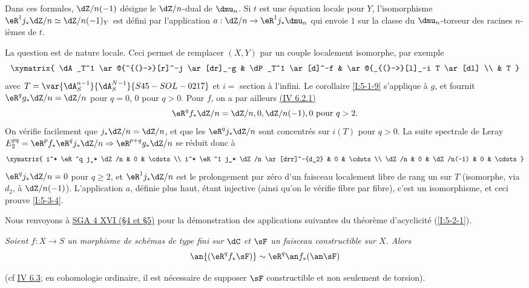 Dans ces formules, $\dZ/n(-1)$ désigne le $\dZ/n$-dual de $\dmu_n$. Si $t$ 
est une équation locale pour $Y$, l'isomorphisme 
$\eR^1j_*\dZ/n\simeq\dZ/n(-1)_Y$ est défini par l'application 
$a:\dZ/n\to \eR^1j_*\dmu_n$ qui envoie $1$ sur la classe du $\dmu_n$-torseur des 
racines $n$-ièmes de $t$. 

La question est de nature locale. Ceci permet de remplacer $(X,Y)$ par un 
couple localement isomorphe, par exemple 
\[\xymatrix{
  \dA_T^1 \ar@{^{(}->}[r]^-j \ar[dr]_-g 
    & \dP_T^1 \ar[d]^-f 
    & \ar@{_{(}->}[l]_-i T \ar[dl] \\
  & T
}\]
avec $T=\var{\dA_S^{n-1}}{\dA_S^{N-1}}{S45-SOL-0217}$ et $i=$ section à l'infini. Le corollaire \ref{I:5-1-9} 
s'applique à $g$, et fournit $\eR^q g_* \dZ/n=\dZ/n$ pour $q=0$, $0$ pour $q>0$. 
Pour $f$, on a par ailleurs \hyperref[I:eq:4-6-2-1]{(IV 6.2.1)}
\[
  \eR^q f_* \dZ/n = \dZ/n,0,\dZ/n(-1),0 \text{ pour $q>2$.}
\]
On vérifie facilement que $j_* \dZ/n = \dZ/n$, et que les $\eR^q j_*\dZ/n$ 
sont concentrés sur $i(T)$ pour $q>0$. La suite spectrale de Leray 
$E_2^{pq} = \eR^p f_* \eR^q j_*\dZ/n \Rightarrow \eR^{p+q}g_* \dZ/n$ se réduit 
donc à 
\[\xymatrix{
  i^* \eR^q j_* \dZ/n & 0 & \cdots \\
  i^* \eR^1 j_* \dZ/n \ar[drr]^-{d_2} & 0 & \cdots \\
  \dZ/n              & 0 & \dZ/n(-1) & 0 & \cdots
}\]
$\eR^q j_*\dZ/n=0$ pour $q\geqslant 2$, et $\eR^1 j_*\dZ/n$ est le prolongement 
par zéro d'un faisceau localement libre de rang un sur $T$ (isomorphe, via 
$d_2$, à $\dZ/n(-1)$). L'application $a$, définie plus haut, étant 
injective (ainsi qu'on le vérifie fibre par fibre), c'est un isomorphisme, et 
ceci prouve \ref{I:5-3-4}. 





\begin{sourcebareinline}\label{I:5-3-5}
Nous renvoyons à \hyperlink{cite.sga4}{SGA 4 XVI (\S 4 et \S 5)} pour la
démonstration des applications suivantes du théorème d'acyclicité
(\ref{I:5-2-1}).
\end{sourcebareinline}





\begingroup
\renewcommand*{\thesubsubsection}{3.5.1}
\begin{sourceinline}\label{I:5-3-6} %
\itshape
Soient $f:X\to S$ un morphisme de schémas de type fini sur $\dC$ et $\sF$ un 
faisceau constructible sur $X$. Alors 
\[
  \an{(\eR^q f_*\sF)} \sim \eR^q \an f_* (\an\sF)
\]
\end{sourceinline}
\endgroup
(cf \hyperref[I:4-6-3]{IV 6.3}; en cohomologie ordinaire, il est nécessaire
de supposer $\sF$ constructible et non seulement de torsion).





